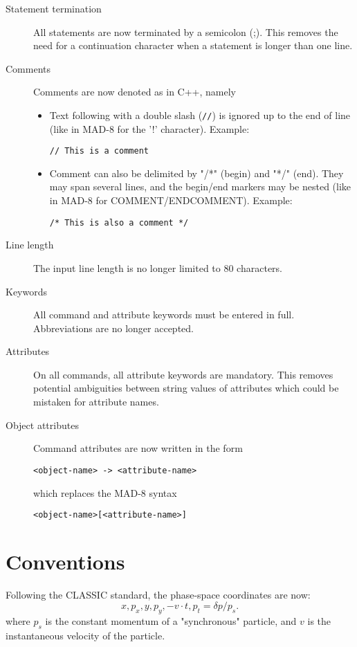 \documentclass{article}
\begin{document}
\begin{description}
\item[Statement termination]
  All statements are now terminated by a semicolon (;).
  This removes the need for a continuation character when a statement is 
  longer than one line.

\item[Comments]
  Comments are now denoted as in C++, namely
  \begin{itemize}
  \item Text following with a double slash (\texttt{//}) is ignored up to
    the end of line (like in MAD-8 for the '!' character). 
    Example:
\begin{verbatim}
// This is a comment
\end{verbatim}
  \item Comment can also be delimited by "/*" (begin) and "*/" (end). 
    They may span several lines, and the begin/end markers may be nested
    (like in MAD-8 for COMMENT/ENDCOMMENT).
    Example:
\begin{verbatim}
/* This is also a comment */
\end{verbatim}
  \end{itemize}

\item[Line length]
  The input line length is no longer limited to 80 characters.

\item[Keywords]
  All command and attribute keywords must be entered in full.
  Abbreviations are no longer accepted.

\item[Attributes]
  On all commands, all attribute keywords are mandatory.
  This removes potential ambiguities between string values of attributes
  which could be mistaken for attribute names.

\item[Object attributes]
  Command attributes are now written in the form
\begin{verbatim}
<object-name> -> <attribute-name>
\end{verbatim}
  which replaces the MAD-8 syntax
\begin{verbatim}
<object-name>[<attribute-name>]
\end{verbatim}
\end{description}

\section{Conventions}
Following the CLASSIC standard, the phase-space coordinates are now:
\[
x, p_{x}, y, p_{y}, - v\cdot t, p_{t} = \delta p / p_{s}.
\]
where $p_{s}$ is the constant momentum of a "synchronous"
particle, and $v$ is the instantaneous velocity of the particle.
\end{document}
